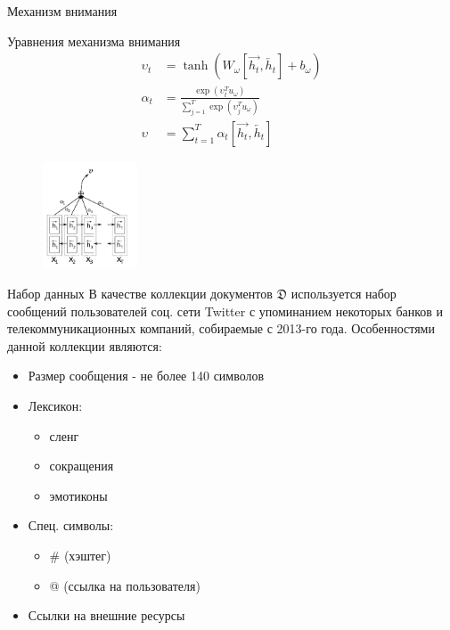 \documentclass{beamer}
\begin{document}
\begin{frame}{Механизм внимания}
	\begin{block}{Уравнения механизма внимания}
	\begin{align}
	\upsilon_{t}&=\tanh{(W_{\omega}\left[\overrightarrow{h_{t}},\overleftarrow{h_{t}}\right]+b_{\omega})}\\
	\alpha_{t}&=\frac{\exp{(\upsilon_{t}^{T}u_{\omega})}}{\sum_{j=1}^{T}\exp{(\upsilon_{j}^{T}u_{\omega})}}\\
	\upsilon&=\sum_{t=1}^{T}\alpha_{t}\left[\overrightarrow{h_{t}},\overleftarrow{h_{t}}\right]
	\end{align}	
	\end{block}
\begin{figure}[!h]
  \includegraphics[width=0.25\textwidth]{images/att_edited.png}
\end{figure}
\end{frame}
\begin{frame}{Набор данных}
	В качестве коллекции документов $\mathfrak{D}$ используется набор сообщений пользователей соц. сети Twitter с упоминанием некоторых банков и телекоммуникационных компаний, собираемые с 2013-го года. Особенностями данной коллекции являются:
	\begin{itemize}
	\item Размер сообщения - не более 140 символов
	\item Лексикон:
		\begin{itemize}
			 \item сленг
			 \item сокращения
			 \item эмотиконы		
		\end{itemize}
	\item Спец. символы:
		\begin{itemize}
			 \item \# (хэштег)
			 \item @ (ссылка на пользователя)
		\end{itemize}
	\item Ссылки на внешние ресурсы
	\end{itemize}
\end{frame}
\end{document}
